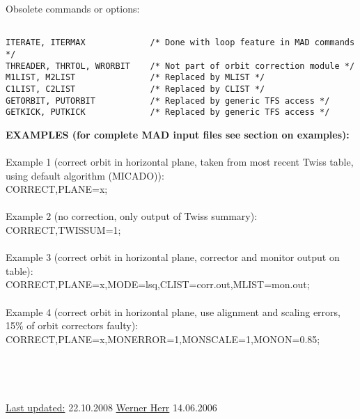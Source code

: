 Obsolete commands or options:%
\begin{verbatim}

ITERATE, ITERMAX             /* Done with loop feature in MAD commands */
THREADER, THRTOL, WRORBIT    /* Not part of orbit correction module */
M1LIST, M2LIST               /* Replaced by MLIST */
C1LIST, C2LIST               /* Replaced by CLIST */
GETORBIT, PUTORBIT           /* Replaced by generic TFS access */
GETKICK, PUTKICK             /* Replaced by generic TFS access */
\end{verbatim}
\textbf{EXAMPLES (for complete MAD input files see section on examples):}
\\
\\ Example 1 (correct orbit in horizontal plane, taken from most recent Twiss table, using default algorithm (MICADO)): 
\\ CORRECT,PLANE=x; 
\\
\\ Example 2 (no correction, only output of Twiss summary): 
\\ CORRECT,TWISSUM=1;                                                              
\\
\\ Example 3 (correct orbit in horizontal plane, corrector and monitor output on table): 
\\ CORRECT,PLANE=x,MODE=lsq,CLIST=corr.out,MLIST=mon.out; 
\\
\\ Example 4 (correct orbit in horizontal plane, use alignment and scaling errors, 15\% of orbit correctors faulty):  CORRECT,PLANE=x,MONERROR=1,MONSCALE=1,MONON=0.85; 
\\
\\
\\
\\
\\\href{http://consult.cern.ch/xwho/people/1808}{Last updated:} 22.10.2008 \href{http://consult.cern.ch/xwho/people/1808}{Werner Herr} 14.06.2006 


